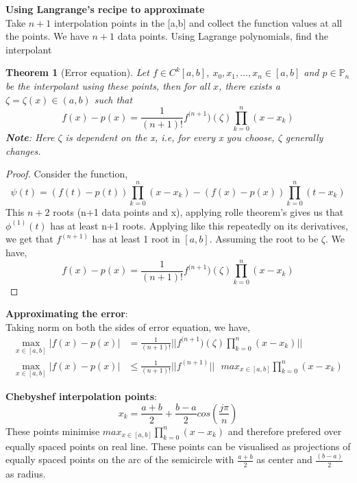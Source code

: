 \documentclass{article}
\newtheorem*{theorem}{Theorem}
\begin{document}
	\noindent\textbf{Using Langrange's recipe to approximate}\\
	Take $n+1$ interpolation points in the [a,b] and collect the function values at all the points. We have $n+1$ data points. Using Lagrange polynomials, find the interpolant\\
		
	\begin{theorem}[Error equation]
	\label{error}
		Let $f\in C^k[a,b]$, $x_0,x_1,\hdots,x_n \in [a,b]$ and $p\in \mathbb{P}_n$ be the interpolant using these points, then for all $x$, there exists a $\zeta = \zeta(x) \in (a,b)$ such that
		\[\boxed{f(x)-p(x) = \frac{1}{(n+1)!}f^{(n+1})(\zeta)\prod_{k=0}^n(x-x_k)}\]
		\textbf{Note}: Here $\zeta$ is dependent on the x, i.e, for every x you choose, $\zeta$ generally changes.\\
	\end{theorem}

	\begin{proof}
		Consider the function,
		\[\psi(t)=(f(t)- p(t))\prod_{k=0}^n(x-x_k) - (f(x)-p(x))\prod_{k=0}^n(t-x_k)\]
		This $n+2$ roots (n+1 data points and x), applying rolle theorem's gives us that $\phi^{(1)}(t)$ has at least n+1 roots. Applying like this repeatedly on its derivatives, we get that $f^{(n+1)}$ has at least 1 root in $[a,b]$. Assuming the root to be $\zeta$. We have,
		\[f(x)-p(x) = \frac{1}{(n+1)!}f^{(n+1})(\zeta)\prod_{k=0}^n(x-x_k)\]
	\end{proof}


	\noindent\textbf{Approximating the error}:\\
	Taking norm on both the sides of error equation, we have,
	\begin{align}
		\max_{x\in [a,b]} |f(x)-p(x)| &= \frac{1}{(n+1)!}||f^{(n+1})(\zeta)\prod_{k=0}^n(x-x_k)||\\
		\max_{x\in [a,b]} |f(x)-p(x)| &\leq \frac{1}{(n+1)!} ||f^{(n+1)}||\text{ }max_{x \in [a,b]}\prod_{k=0}^n(x-x_k)
	\end{align}

	\noindent\textbf{Chebyshef interpolation points}:
		\[x_k= \frac{a+b}{2}+\frac{b-a}{2}cos\left(\frac{j\pi}{n}\right)\]
	\noindent These points minimise $max_{x \in [a,b]}\prod_{k=0}^n(x-x_k)$ and therefore prefered over equally spaced points on real line. These points can be visualised as projections of equally spaced points on the arc of the semicircle with $\frac{a+b}{2}$ as center and $\frac{(b-a)}{2}$ as radius.
\end{document}
